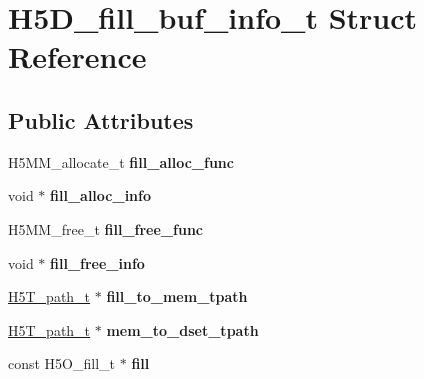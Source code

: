 \hypertarget{struct_h5_d__fill__buf__info__t}{}\section{H5\+D\+\_\+fill\+\_\+buf\+\_\+info\+\_\+t Struct Reference}
\label{struct_h5_d__fill__buf__info__t}
\subsection*{Public Attributes}
\begin{DoxyCompactItemize}
\item 
\mbox{\label{struct_h5_d__fill__buf__info__t_a6d36841badc20d22851c207648f507d2}} 
H5\+M\+M\+\_\+allocate\+\_\+t {\bfseries fill\+\_\+alloc\+\_\+func}
\item 
\mbox{\label{struct_h5_d__fill__buf__info__t_ac1684bf5adba961a0a4e1b608a3f3216}} 
void $\ast$ {\bfseries fill\+\_\+alloc\+\_\+info}
\item 
\mbox{\label{struct_h5_d__fill__buf__info__t_a2b0a51436632adeec5b0d6c407444e7d}} 
H5\+M\+M\+\_\+free\+\_\+t {\bfseries fill\+\_\+free\+\_\+func}
\item 
\mbox{\label{struct_h5_d__fill__buf__info__t_affd12aba04acc648ead0cb773718c948}} 
void $\ast$ {\bfseries fill\+\_\+free\+\_\+info}
\item 
\mbox{\label{struct_h5_d__fill__buf__info__t_aded6572ea99cb201a0467a2ab7aa3f7e}} 
\hyperlink{struct_h5_t__path__t}{H5\+T\+\_\+path\+\_\+t} $\ast$ {\bfseries fill\+\_\+to\+\_\+mem\+\_\+tpath}
\item 
\mbox{\label{struct_h5_d__fill__buf__info__t_af3a37bfeca33aebda090111ed17618a9}} 
\hyperlink{struct_h5_t__path__t}{H5\+T\+\_\+path\+\_\+t} $\ast$ {\bfseries mem\+\_\+to\+\_\+dset\+\_\+tpath}
\item 
\mbox{\label{struct_h5_d__fill__buf__info__t_a384c46c58583384f327e61fbca2140d5}} 
const H5\+O\+\_\+fill\+\_\+t $\ast$ {\bfseries fill}

\end{DoxyCompactItemize}

